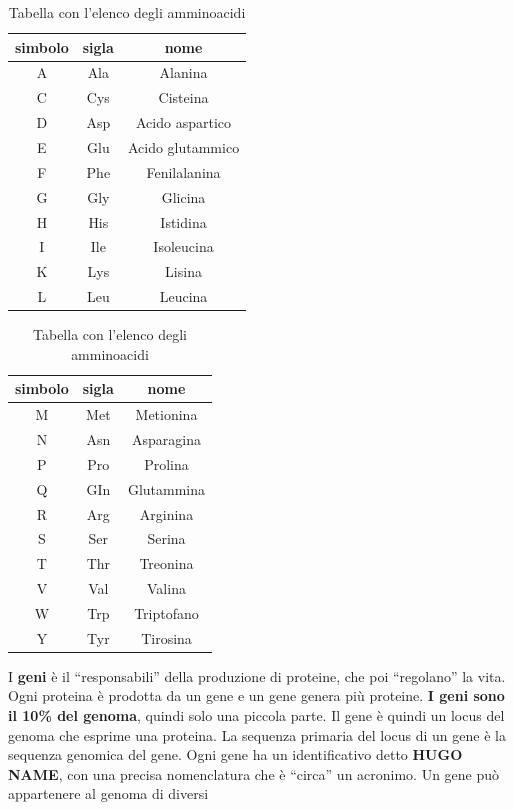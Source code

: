 \documentclass[a4paper,12pt, oneside]{book}
\begin{document}
\begin{table}
  \centering
  \begin{tabular}{|c|c|c|}
    \hline simbolo&sigla & nome \\
    \hline A & Ala & Alanina \\
    \hline C & Cys & Cisteina \\
    \hline D & Asp & Acido aspartico \\
    \hline E & Glu & Acido glutammico \\
    \hline F & Phe & Fenilalanina \\
    \hline G & Gly & Glicina \\
    \hline H & His & Istidina \\
    \hline I & Ile & Isoleucina \\
    \hline K & Lys & Lisina \\
    \hline L & Leu & Leucina \\
    \hline
  \end{tabular}
  \begin{tabular}{|c|c|c|}
    \hline simbolo&sigla & nome \\
    
    \hline M & Met & Metionina \\
    \hline N & Asn & Asparagina  \\
    \hline P & Pro & Prolina  \\
    \hline Q & GIn & Glutammina \\
    \hline R & Arg & Arginina  \\
    \hline S & Ser & Serina  \\
    \hline T & Thr & Treonina\\
    \hline V & Val & Valina  \\
    \hline W & Trp & Triptofano \\
    \hline Y & Tyr & Tirosina \\
    \hline
  \end{tabular}
  \caption{Tabella con l'elenco degli amminoacidi}
  \label{tab:ammi}
\end{table}
I \textbf{geni} è il ``responsabili'' della produzione di proteine, che poi
``regolano'' la vita. Ogni proteina è prodotta da un gene e un gene genera più
proteine.\textbf{ I geni sono il 10\% del genoma}, quindi solo una piccola
parte. Il gene è quindi un locus del genoma che esprime una proteina. La
sequenza primaria del locus di un gene è la sequenza genomica del gene. Ogni
gene ha un identificativo detto \textbf{HUGO NAME}, con una precisa nomenclatura
che è ``circa'' un acronimo. Un gene può appartenere al genoma di diversi
\end{document}
